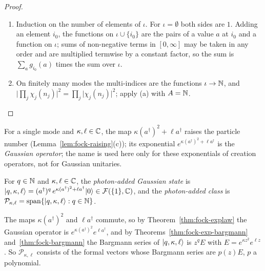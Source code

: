 \begin{vetbenv}
\begin{proof}
\begin{enumerate}
\item[(a)] Induction on the number of elements of $\iota$. For $\iota=\emptyset$ both sides are $1$.
Adding an element $i_0$, the functions on $\iota\cup\{i_0\}$ are the pairs of a value $a$ at $i_0$ and a
function on $\iota$; sums of non-negative terms in $[0,\infty]$ may be taken in any order and are
multiplied termwise by a constant factor, so the sum is $\sum_ag_{i_0}(a)$ times the sum over $\iota$.
\item[(b)] On finitely many modes the multi-indices are the functions $\iota\to\mathbb N$, and
$\lvert\prod_j\chi_j(n_j)\rvert^2=\prod_j\lvert\chi_j(n_j)\rvert^2$; apply (a) with $A=\mathbb N$.\qedhere
\end{enumerate}
\end{proof}

For a single mode and $\kappa,\ell\in\mathbb C$, the map $\kappa(a^\dagger)^2+\ell a^\dagger$ raises the particle
number (Lemma~\ref{lem:fock-raising}(c)); its exponential $e^{\kappa(a^\dagger)^2+\ell a^\dagger}$ is the
\emph{Gaussian operator}; the name is used here only for these exponentials of creation operators, not for
Gaussian unitaries.

\begin{definition}\label{def:fock-photon}
For $q\in\mathbb N$ and $\kappa,\ell\in\mathbb C$, the \emph{photon-added Gaussian state} is $\lvert q,\kappa,\ell\rangle=
(a^\dagger)^q\,e^{\kappa(a^\dagger)^2+\ell a^\dagger}\lvert 0\rangle\in\mathcal F(\{1\},\mathbb C)$, and the \emph{photon-added
class} is $\mathcal P_{\kappa,\ell}=\operatorname{span}\{\lvert q,\kappa,\ell\rangle:q\in\mathbb N\}$.
\end{definition}

 The maps $\kappa(a^\dagger)^2$ and
$\ell a^\dagger$ commute, so by Theorem~\ref{thm:fock-explaw} the Gaussian operator is
$e^{\kappa(a^\dagger)^2}e^{\ell a^\dagger}$, and by Theorems~\ref{thm:fock-exp-bargmann}
and~\ref{thm:fock-bargmann} the Bargmann series of $\lvert q,\kappa,\ell\rangle$ is $z^qE$ with
$E=e^{\kappa z^2}e^{\ell z}$. So $\mathcal P_{\kappa,\ell}$ consists of the formal vectors whose Bargmann
series are $p(z)E$, $p$ a polynomial.


\end{vetbenv}
